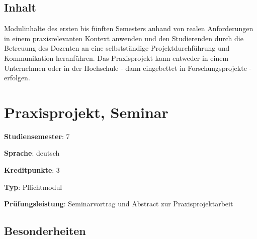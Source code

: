 \hypertarget{inhaltpathlabel....srcmodulbeschreibungen-bachelor-bpo5ba_praxisprojektarbeit}{%
\section*{Inhalt\label{../../src/modulbeschreibungen-bachelor-bpo5/BA_Praxisprojektarbeit}}\label{inhaltpathlabel....srcmodulbeschreibungen-bachelor-bpo5ba_praxisprojektarbeit}}

Modulinhalte des ersten bis fünften Semesters anhand von realen
Anforderungen in einem praxisrelevanten Kontext anwenden und den
Studierenden durch die Betreuung des Dozenten an eine selbstständige
Projektdurchführung und Kommunikation heranführen. Das Praxisprojekt
kann entweder in einem Unternehmen oder in der Hochschule - dann
eingebettet in Forschungsprojekte - erfolgen.

\hypertarget{praxisprojekt-seminarpathlabel....srcmodulbeschreibungen-bachelor-bpo5ba_praxisprojektseminar}{%
\chapter{Praxisprojekt,
Seminar\label{../../src/modulbeschreibungen-bachelor-bpo5/BA_Praxisprojektseminar}}\label{praxisprojekt-seminarpathlabel....srcmodulbeschreibungen-bachelor-bpo5ba_praxisprojektseminar}}

\begin{modulHead}
\textbf{Studiensemester}:
7
\end{modulHead}
\begin{modulHead}
\textbf{Sprache}:
deutsch
\end{modulHead}
\begin{modulHead}
\textbf{Kreditpunkte}:
3
\end{modulHead}
\begin{modulHead}
\textbf{Typ}:
Pflichtmodul
\end{modulHead}
\begin{modulHead}
\textbf{Prüfungsleistung}:
Seminarvortrag und Abstract zur Praxisprojektarbeit
\end{modulHead}


\hypertarget{besonderheitenpathlabel....srcmodulbeschreibungen-bachelor-bpo5ba_praxisprojektseminar}{%
\section*{Besonderheiten\label{../../src/modulbeschreibungen-bachelor-bpo5/BA_Praxisprojektseminar}}\label{besonderheitenpathlabel....srcmodulbeschreibungen-bachelor-bpo5ba_praxisprojektseminar}}

